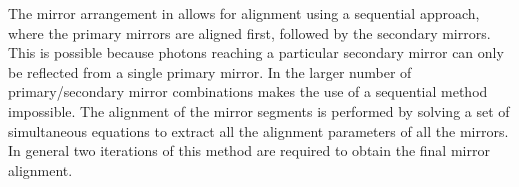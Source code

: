 The mirror arrangement in \richone allows for alignment using a sequential approach, where the primary mirrors are aligned first, followed by the secondary mirrors. This is possible because photons reaching a particular secondary mirror can only be reflected from a single primary mirror. In \richtwo the larger number of primary/secondary mirror combinations makes the use of a sequential method impossible. The alignment of the \richtwo mirror segments is performed by solving a set of simultaneous equations to extract all the alignment parameters of all the mirrors. In general two iterations of this method are required to obtain the final mirror alignment.\\
\\
